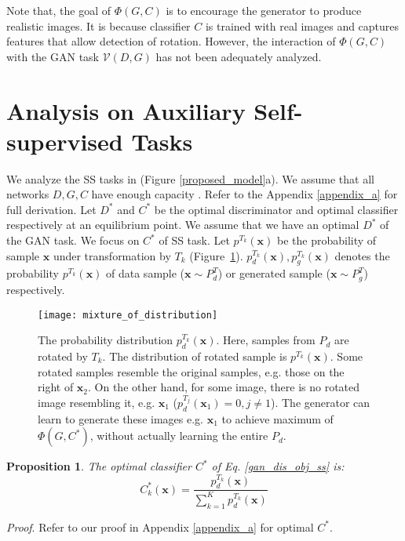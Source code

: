 \documentclass{article}
\newtheorem{proposition}{Proposition}
\begin{document}
Note that, the goal of $\Phi(G,C)$ is to encourage the generator to produce realistic images. It is because classifier $C$ is trained with real images and captures features that allow detection of rotation. However, the interaction of $\Phi(G,C)$ with the GAN task $\mathcal{V}(D,G)$ has not been adequately analyzed. 



 
\section{Analysis on Auxiliary Self-supervised Tasks}
\label{analysis_on_auxiliary_ss}

We analyze the SS tasks in \cite{chen-arxiv-2018} (Figure \ref{proposed_model}a).
We assume that all networks $D, G, C$ have enough capacity \cite{goodfellow-nisp-2014}. Refer to the Appendix \ref{appendix_a} for full derivation. Let $D^*$ and $C^*$ be the optimal discriminator and optimal classifier respectively at an equilibrium point. We assume that we have an optimal $D^*$ of the GAN task. We focus on $C^*$ of SS task. Let $p^{T_k}(\mathbf{x})$ be the probability of sample $\mathbf{x}$ 
under transformation by $T_k$
(Figure~\ref{mixture_of_distribution}). $p_d^{T_k}(\mathbf{x}), p_g^{T_k}(\mathbf{x})$ denotes the probability $p^{T_k}(\mathbf{x})$ of data sample ($\mathbf{x} \sim P_d^T$) or generated sample ($\mathbf{x} \sim P_g^T$) respectively.

\begin{figure}
  \centering
  \texttt{[image: mixture\_of\_distribution]}
  \caption{The probability distribution $p_d^{T_k}(\mathbf{x})$. Here, samples from $P_d$ are rotated by $T_k$. The distribution of rotated sample is $p^{T_k}(\mathbf{x})$.
Some rotated samples resemble the original samples, e.g. those on the right of $\mathbf{x}_2$. On the other hand, for some image, there is no rotated image resembling it, e.g. $\mathbf{x}_1$ ($p_d^{T_j}(\mathbf{x}_1) = 0, j \neq 1$). The generator can learn to generate these images e.g. $\mathbf{x}_1$ to achieve maximum of $\Phi(G,C^*)$, without actually learning the entire $P_d$.
  }
\label{mixture_of_distribution}
   \vspace{-0.3cm}
\end{figure}


\begin{proposition}
The optimal classifier $C^*$ of Eq. \ref{gan_dis_obj_ss} is:
\begin{equation}
C^*_k(\mathbf{x}) = \frac{p_d^{T_k}(\mathbf{x})}{\sum_{k=1}^{K}p_d^{T_k}(\mathbf{x})}
\label{optimal_c_d}
\end{equation}
\label{prop_1}
\end{proposition}
\noindent \textit{Proof}. Refer to our proof in Appendix \ref{appendix_a} for optimal $C^*$.
\end{document}
